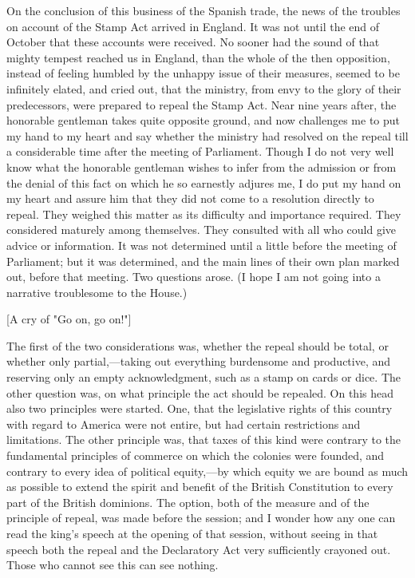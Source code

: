 On the conclusion of this business of the Spanish trade, the news of the troubles on account of the Stamp Act arrived in England. It was not until the end of October that these accounts were received. No sooner had the sound of that mighty tempest reached us in England, than the whole of the then opposition, instead of feeling humbled by the unhappy issue of their measures, seemed to be infinitely elated, and cried out, that the ministry, from envy to the glory of their predecessors, were prepared to repeal the Stamp Act. Near nine years after, the honorable gentleman takes quite opposite ground, and now challenges me to put my hand to my heart and say whether the ministry had resolved on the repeal till a considerable time after the meeting of Parliament. Though I do not very well know what the honorable gentleman wishes to infer from the admission or from the denial of this fact on which he so earnestly adjures me, I do put my hand on my heart and assure him that they did not come to a resolution directly to repeal. They weighed this matter as its difficulty and importance required. They considered maturely among themselves. They consulted with all who could give advice or information. It was not determined until a little before the meeting of Parliament; but it was determined, and the main lines of their own plan marked out, before that meeting. Two questions arose. (I hope I am not going into a narrative troublesome to the House.)

[A cry of "Go on, go on!"]

The first of the two considerations was, whether the repeal should be total, or whether only partial,—taking out everything burdensome and productive, and reserving only an empty acknowledgment, such as a stamp on cards or dice. The other question was, on what principle the act should be repealed. On this head also two principles were started. One, that the legislative rights of this country with regard to America were not entire, but had certain restrictions and limitations. The other principle was, that taxes of this kind were contrary to the fundamental principles of commerce on which the colonies were founded, and contrary to every idea of political equity,—by which equity we are bound as much as possible to extend the spirit and benefit of the British Constitution to every part of the British dominions. The option, both of the measure and of the principle of repeal, was made before the session; and I wonder how any one can read the king's speech at the opening of that session, without seeing in that speech both the repeal and the Declaratory Act very sufficiently crayoned out. Those who cannot see this can see nothing.

